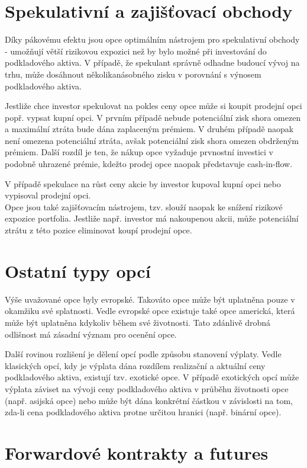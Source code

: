 \documentclass[a4paper]{book}
\begin{document}
\section{Spekulativní a zajišťovací obchody}

Díky pákovému efektu jsou opce optimálním nástrojem pro spekulativní obchody - umožňují větší rizikovou expozici než by bylo možné při investování do podkladového aktiva. V případě, že spekulant správně odhadne budoucí vývoj na trhu, může dosáhnout několikanásobného zisku v porovnání s výnosem podkladového aktiva.

Jestliže chce investor spekulovat na pokles ceny opce může si koupit prodejní opci popř. vypsat kupní opci. V prvním případě nebude potenciální zisk shora omezen a maximální ztráta bude dána zaplaceným prémiem. V druhém případě naopak není omezena potenciální ztráta, avšak potenciální zisk shora omezen obdrženým prémiem. Další rozdíl je ten, že nákup opce vyžaduje prvnostní investici v podobně uhrazené prémie, kdežto prodej opce naopak představuje cash-in-flow.

V případě spekulace na růst ceny akcie by investor kupoval kupní opci nebo vypisoval prodejní opci.\\

Opce jsou také zajišťovacím nástrojem, tzv. slouží naopak ke snížení rizikové expozice portfolia. Jestliže např. investor má nakoupenou akcii, může potenciální ztrátu z této pozice eliminovat koupí prodejní opce.

\section{Ostatní typy opcí}

Výše uvažované opce byly evropské. Takováto opce může být uplatněna pouze v okamžiku své splatnosti. Vedle evropské opce existuje také opce americká, která může být uplatněna kdykoliv během své životnosti. Tato zdánlivě drobná odlišnost má zásadní význam pro ocenění opce.

Další rovinou rozlišení je dělení opcí podle způsobu stanovení výplaty. Vedle klasických opcí, kdy je výplata dána rozdílem realizační a aktuální ceny podkladového aktiva, existují tzv. exotické opce. V případě exotických opcí může výplata záviset na vývoji ceny podkladového aktiva v průběhu životnosti opce (např. asijská opce) nebo může být dána konkrétní částkou v závislosti na tom, zda-li cena podkladového aktiva protne určitou hranici (např. binární opce).

\section{Forwardové kontrakty a futures}
\end{document}
